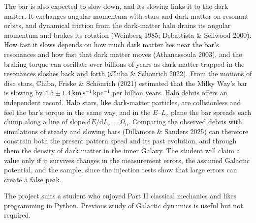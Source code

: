 \documentclass[11pt,a4paper]{article}
\begin{document}
The bar is also expected to slow down, and its slowing links it to the dark matter. It exchanges angular momentum with stars and dark matter on resonant orbits, and dynamical friction from the dark-matter halo drains its angular momentum and brakes its rotation (Weinberg 1985; Debattista \& Sellwood 2000). How fast it slows depends on how much dark matter lies near the bar's resonances and how fast that dark matter moves (Athanassoula 2003), and the braking torque can oscillate over billions of years as dark matter trapped in the resonances sloshes back and forth (Chiba \& Schönrich 2022). From the motions of disc stars, Chiba, Friske \& Schönrich (2021) estimated that the Milky Way's bar is slowing by $4.5 \pm 1.4\,\mathrm{km\,s^{-1}\,kpc^{-1}}$ per billion years. Halo debris offers an independent record. Halo stars, like dark-matter particles, are collisionless and feel the bar's torque in the same way, and in the $E$--$L_z$ plane the bar spreads each clump along a line of slope $\mathrm{d}E/\mathrm{d}L_z = \Omega_\mathrm{b}$. Comparing the observed debris with simulations of steady and slowing bars (Dillamore \& Sanders 2025) can therefore constrain both the present pattern speed and its past evolution, and through them the density of dark matter in the inner Galaxy. The student will claim a value only if it survives changes in the measurement errors, the assumed Galactic potential, and the sample, since the injection tests show that large errors can create a false peak.

The project suits a student who enjoyed Part II classical mechanics and likes programming in Python. Previous study of Galactic dynamics is useful but not required.
\end{document}
